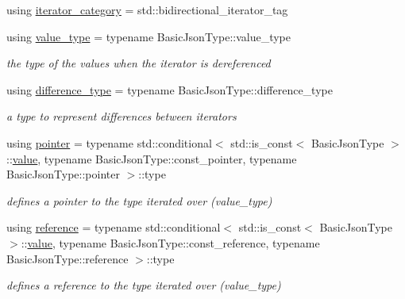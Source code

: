 \begin{DoxyCompactItemize}
\item 
using \mbox{\hyperlink{classnlohmann_1_1detail_1_1iter__impl_ad9e091f5c70b34b5b1abc1ab15fd9106}{iterator\+\_\+category}} = std\+::bidirectional\+\_\+iterator\+\_\+tag
\item 
\mbox{\label{classnlohmann_1_1detail_1_1iter__impl_ab35586a44f2222272c5346baa3013f67}} 
using \mbox{\hyperlink{classnlohmann_1_1detail_1_1iter__impl_ab35586a44f2222272c5346baa3013f67}{value\+\_\+type}} = typename Basic\+Json\+Type\+::value\+\_\+type
\begin{DoxyCompactList}\small\item\em the type of the values when the iterator is dereferenced \end{DoxyCompactList}\item 
\mbox{\label{classnlohmann_1_1detail_1_1iter__impl_a2f7ea9f7022850809c60fc3263775840}} 
using \mbox{\hyperlink{classnlohmann_1_1detail_1_1iter__impl_a2f7ea9f7022850809c60fc3263775840}{difference\+\_\+type}} = typename Basic\+Json\+Type\+::difference\+\_\+type
\begin{DoxyCompactList}\small\item\em a type to represent differences between iterators \end{DoxyCompactList}\item 
\mbox{\label{classnlohmann_1_1detail_1_1iter__impl_a69e52f890ce8c556fd68ce109e24b360}} 
using \mbox{\hyperlink{classnlohmann_1_1detail_1_1iter__impl_a69e52f890ce8c556fd68ce109e24b360}{pointer}} = typename std\+::conditional$<$ std\+::is\+\_\+const$<$ Basic\+Json\+Type $>$\+::\mbox{\hyperlink{classnlohmann_1_1detail_1_1iter__impl_ab447c50354c6611fa2ae0100ac17845c}{value}}, typename Basic\+Json\+Type\+::const\+\_\+pointer, typename Basic\+Json\+Type\+::pointer $>$\+::type
\begin{DoxyCompactList}\small\item\em defines a pointer to the type iterated over (value\+\_\+type) \end{DoxyCompactList}\item 
\mbox{\label{classnlohmann_1_1detail_1_1iter__impl_a5be8001be099c6b82310f4d387b953ce}} 
using \mbox{\hyperlink{classnlohmann_1_1detail_1_1iter__impl_a5be8001be099c6b82310f4d387b953ce}{reference}} = typename std\+::conditional$<$ std\+::is\+\_\+const$<$ Basic\+Json\+Type $>$\+::\mbox{\hyperlink{classnlohmann_1_1detail_1_1iter__impl_ab447c50354c6611fa2ae0100ac17845c}{value}}, typename Basic\+Json\+Type\+::const\+\_\+reference, typename Basic\+Json\+Type\+::reference $>$\+::type
\begin{DoxyCompactList}\small\item\em defines a reference to the type iterated over (value\+\_\+type) \end{DoxyCompactList}\end{DoxyCompactItemize}
